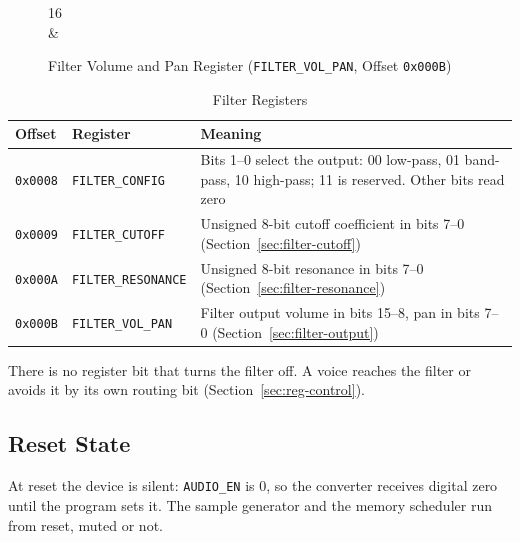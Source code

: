 \begin{figure}[H]
	\centering
	\begin{bytefield}[bitwidth=2em]{16}
		 \\
		 &
	\end{bytefield}
	\caption{Filter Volume and Pan Register (\texttt{FILTER\_VOL\_PAN}, Offset \texttt{0x000B})}
	\label{fig:reg-filter-vol-pan}
\end{figure}

\begin{table}[H]
	\centering
	\begin{tabular}{llp{7.5cm}}
		\toprule
		\textbf{Offset} & \textbf{Register}          & \textbf{Meaning}                                                                                           \\
		\midrule
		\texttt{0x0008} & \texttt{FILTER\_CONFIG}    & Bits 1--0 select the output: 00 low-pass, 01 band-pass, 10 high-pass; 11 is reserved. Other bits read zero \\
		\texttt{0x0009} & \texttt{FILTER\_CUTOFF}    & Unsigned 8-bit cutoff coefficient in bits 7--0 (Section~\ref{sec:filter-cutoff})                           \\
		\texttt{0x000A} & \texttt{FILTER\_RESONANCE} & Unsigned 8-bit resonance in bits 7--0 (Section~\ref{sec:filter-resonance})                                 \\
		\texttt{0x000B} & \texttt{FILTER\_VOL\_PAN}  & Filter output volume in bits 15--8, pan in bits 7--0 (Section~\ref{sec:filter-output})                     \\
		\bottomrule
	\end{tabular}
	\caption{Filter Registers}
	\label{tab:reg-filter}
\end{table}

There is no register bit that turns the filter off. A voice reaches the filter or avoids it by its own routing bit
(Section~\ref{sec:reg-control}).

\subsection{Reset State}
\label{sec:reset}

At reset the device is silent: \texttt{AUDIO\_EN} is 0, so the converter receives digital zero until the program sets
it. The sample generator and the memory scheduler run from reset, muted or not.

